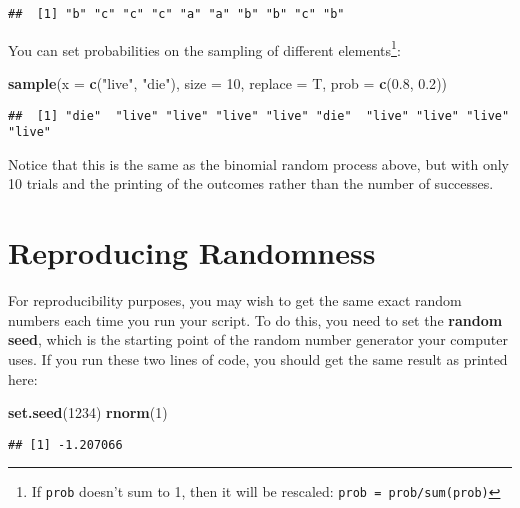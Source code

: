 \documentclass[]{book}
\newenvironment{Shaded}{\begin{snugshade}}{\end{snugshade}}
\newcommand{\KeywordTok}[1]{\textcolor[rgb]{0.13,0.29,0.53}{\textbf{#1}}}
\newcommand{\DataTypeTok}[1]{\textcolor[rgb]{0.13,0.29,0.53}{#1}}
\newcommand{\DecValTok}[1]{\textcolor[rgb]{0.00,0.00,0.81}{#1}}
\newcommand{\FloatTok}[1]{\textcolor[rgb]{0.00,0.00,0.81}{#1}}
\newcommand{\StringTok}[1]{\textcolor[rgb]{0.31,0.60,0.02}{#1}}
\newcommand{\NormalTok}[1]{#1}
\let\rmarkdownfootnote\footnote%
\def\footnote{\protect\rmarkdownfootnote}
\theoremstyle{definition}
\theoremstyle{definition}
\theoremstyle{definition}
\theoremstyle{remark}
\begin{document}
\begin{verbatim}
##  [1] "b" "c" "c" "c" "a" "a" "b" "b" "c" "b"
\end{verbatim}

You can set probabilities on the sampling of different
elements\footnote{If \texttt{prob} doesn't sum to 1, then it will be
  rescaled: \texttt{prob\ =\ prob/sum(prob)}}:

\begin{Shaded}
\begin{Highlighting}[]
\KeywordTok{sample}\NormalTok{(}\DataTypeTok{x =} \KeywordTok{c}\NormalTok{(}\StringTok{"live"}\NormalTok{, }\StringTok{"die"}\NormalTok{), }\DataTypeTok{size =} \DecValTok{10}\NormalTok{, }\DataTypeTok{replace =}\NormalTok{ T,}
       \DataTypeTok{prob =} \KeywordTok{c}\NormalTok{(}\FloatTok{0.8}\NormalTok{, }\FloatTok{0.2}\NormalTok{))}
\end{Highlighting}
\end{Shaded}

\begin{verbatim}
##  [1] "die"  "live" "live" "live" "live" "die"  "live" "live" "live" "live"
\end{verbatim}

Notice that this is the same as the binomial random process above, but
with only 10 trials and the printing of the outcomes rather than the
number of successes.

\section{Reproducing Randomness}\label{reproducing-randomness}

For reproducibility purposes, you may wish to get the same exact random
numbers each time you run your script. To do this, you need to set the
\textbf{random seed}, which is the starting point of the random number
generator your computer uses. If you run these two lines of code, you
should get the same result as printed here:

\begin{Shaded}
\begin{Highlighting}[]
\KeywordTok{set.seed}\NormalTok{(}\DecValTok{1234}\NormalTok{)}
\KeywordTok{rnorm}\NormalTok{(}\DecValTok{1}\NormalTok{)}
\end{Highlighting}
\end{Shaded}

\begin{verbatim}
## [1] -1.207066
\end{verbatim}
\end{document}
